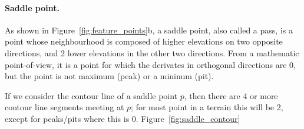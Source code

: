\paragraph{Saddle point.}
As shown in Figure~\ref{fig:feature_points}b, a saddle point, also called a pass, is a point whose neighbourhood is composed of higher elevations on two opposite directions, and 2 lower elevations in the other two directions.
From a mathematic point-of-view, it is a point for which the derivates in orthogonal directions are 0, but the point is not maximum (peak) or a mininum (pit).

%

If we consider the contour line of a saddle point $p$, then there are 4 or more contour line segments meeting at $p$; for most point in a terrain this will be 2, except for peaks/pits where this is 0.
Figure~\ref{fig:saddle_contour}
